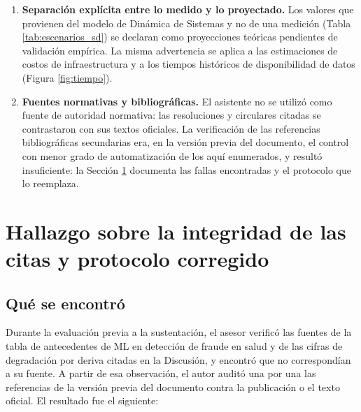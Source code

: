 \documentclass[12pt,letterpaper]{report}
\begin{document}
\begin{enumerate}
    \item \textbf{Separación explícita entre lo medido y lo proyectado.} Los valores que
    provienen del modelo de Dinámica de Sistemas y no de una medición
    (Tabla \ref{tab:escenarios_sd}) se declaran como proyecciones teóricas pendientes de
    validación empírica. La misma advertencia se aplica a las estimaciones de costos de
    infraestructura y a los tiempos históricos de disponibilidad de datos
    (Figura \ref{fig:tiempo}).

    \item \textbf{Fuentes normativas y bibliográficas.} El asistente no se utilizó como
    fuente de autoridad normativa: las resoluciones y circulares citadas se contrastaron
    con sus textos oficiales. La verificación de las referencias bibliográficas
    secundarias era, en la versión previa del documento, el control con menor grado de
    automatización de los aquí enumerados, y resultó insuficiente: la
    Sección \ref{sec:hallazgo_citas} documenta las fallas encontradas y el protocolo
    que lo reemplaza.
\end{enumerate}

\section{Hallazgo sobre la integridad de las citas y protocolo corregido}
\label{sec:hallazgo_citas}

\subsection{Qué se encontró}

Durante la evaluación previa a la sustentación, el asesor verificó las fuentes de la
tabla de antecedentes de ML en detección de fraude en salud y de las cifras de
degradación por deriva citadas en la Discusión, y encontró que no correspondían a su
fuente. A partir de esa observación, el autor auditó una por una las referencias de la
versión previa del documento contra la publicación o el texto oficial. El resultado fue
el siguiente:
\end{document}
